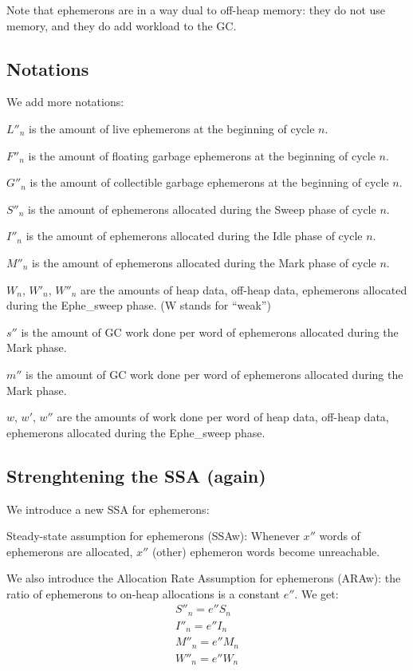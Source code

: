\documentclass{article}
\begin{document}
Note that ephemerons are in a way dual to off-heap memory: they do not
use memory, and they do add workload to the GC.

\subsection{Notations}

We add more notations:

\bigskip
$L''_n$ is the amount of live ephemerons at the beginning of cycle $n$.

$F''_n$ is the amount of floating garbage ephemerons at the beginning
of cycle $n$.

$G''_n$ is the amount of collectible garbage ephemerons at the
beginning of cycle $n$.

$S''_n$ is the amount of ephemerons allocated during the Sweep phase
of cycle $n$.

$I''_n$ is the amount of ephemerons allocated during the Idle phase
of cycle $n$.

$M''_n$ is the amount of ephemerons allocated during the Mark phase
of cycle $n$.

$W_n$, $W'_n$, $W''_n$ are the amounts of heap data, off-heap
data, ephemerons allocated during the Ephe\_sweep phase. (W stands for
``weak'')

$s''$ is the amount of GC work done per word of ephemerons allocated
during the Mark phase.

$m''$ is the amount of GC work done per word of ephemerons allocated
during the Mark phase.

$w$, $w'$, $w''$ are the amounts of work done per word of
heap data, off-heap data, ephemerons allocated during the Ephe\_sweep
phase.


\subsection{Strenghtening the SSA (again)}

We introduce a new SSA for ephemerons:

Steady-state assumption for ephemerons (SSAw): Whenever $x''$
words of ephemerons are allocated, $x''$ (other) ephemeron words
become unreachable.

We also introduce the Allocation Rate Assumption for ephemerons
(ARAw): the ratio of ephemerons to on-heap allocations is a constant
$e''$. We get:
\begin{gather}
S''_n = e''S_n \label{eqn-S''} \\
I''_n = e''I_n \label{eqn-I''} \\
M''_n = e''M_n \label{eqn-M''} \\
W''_n = e''W_n \label{eqn-W''}
\end{gather}
\end{document}

